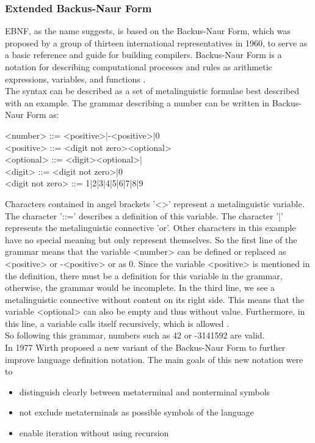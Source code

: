 \subsubsection{Extended Backus-Naur Form}\label{sec:EBNF}
\ac{EBNF}, as the name suggests, is based on the Backus-Naur Form, which was proposed by a group of thirteen international representatives in 1960, to serve as a basic reference and guide for building compilers. Backus-Naur Form is a notation for describing computational processes and rules as arithmetic expressions, variables, and functions \parencite[cf.][p. 300]{backus_report_1960}.\\
The syntax can be described as a set of metalinguistic formulae best described with an example. The grammar describing a number can be written in Backus-Naur Form as:
\begin{grammar}
    <number> ::= <positive>|-<positive>|0 \\
    <positive> ::= <digit not zero><optional> \\
    <optional> ::= <digit><optional>| \\
    <digit> ::= <digit not zero>|0 \\
    <digit not zero> ::= 1|2|3|4|5|6|7|8|9
\end{grammar}
Characters contained in angel brackets '<>' represent a metalinguistic variable. The character '::=' describes a definition of this variable. The character '|' represents the metalinguistic connective 'or'. Other characters in this example have no special meaning but only represent themselves. So the first line of the grammar means that the variable <number> can be defined or replaced as <positive> or -<positive> or as 0. Since the variable <positive> is mentioned in the definition, there must be a definition for this variable in the grammar, otherwise, the grammar would be incomplete. In the third line, we see a metalinguistic connective without content on its right side. This means that the variable <optional> can also be empty and thus without value. Furthermore, in this line, a variable calls itself recursively, which is allowed \parencite[cf.][pp. 301-303]{backus_report_1960}.\\
So following this grammar, numbers such as 42 or -3141592 are valid.\\
In 1977 Wirth proposed a new variant of the Backus-Naur Form to further improve language definition notation. The main goals of this new notation were to \parencite[cf.][p. 822]{wirth_what_1977}
\begin{itemize}[noitemsep]
    \item distinguish clearly between metaterminal and nonterminal symbols
    \item not exclude metaterminals as possible symbols of the language
    \item enable iteration without using recursion
\end{itemize}
